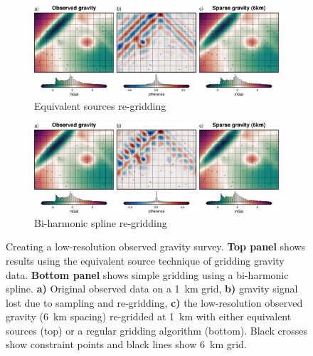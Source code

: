 \begin{figure}[!ht]
\renewcommand\thesubfigure{\arabic{subfigure}}
  \centering
    \begin{subfigure}[t]{.95\textwidth}
        \centering
        \includegraphics[width=\textwidth]{figures/chp3/chp3_simple_sampled_gravity_eq_sources.png}
        \caption{Equivalent sources re-gridding}
    \end{subfigure}
    \begin{subfigure}[t]{.95\textwidth}
        \centering
        \includegraphics[width=\textwidth]{figures/chp3/chp3_simple_sampled_gravity_regular_gridding.png}
        \caption{Bi-harmonic spline re-gridding}
    \end{subfigure}
  \caption[Creating a low-resolution observed gravity survey]{Creating a low-resolution observed gravity survey. \textbf{Top panel} shows results using the equivalent source technique of gridding gravity data. \textbf{Bottom panel} shows simple gridding using a bi-harmonic spline. \textbf{a)} Original observed data on a 1~km grid, \textbf{b)} gravity signal lost due to sampling and re-gridding, \textbf{c)} the low-resolution observed gravity (6~km spacing) re-gridded at 1~km with either equivalent sources (top) or a regular gridding algorithm (bottom). Black crosses show constraint points and black lines show 6~km grid.}
    \label{fig:chp3_simple_eq_sources_regridding}
\end{figure}

